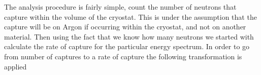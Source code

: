 The analysis procedure is fairly simple, count the number of neutrons that capture within the volume of the cryostat.
This is under the assumption that the capture will be on Argon if occurring within the cryostat, and not on another material.
Then using the fact that we know how many neutrons we started with calculate the rate of capture for the particular energy spectrum.
In order to go from number of captures to a rate of capture the following transformation is applied

